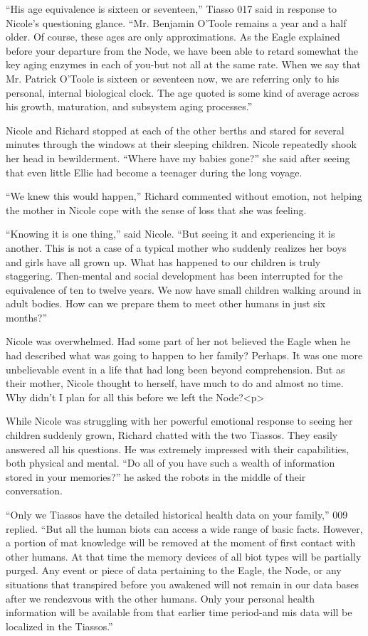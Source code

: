 \documentclass[]{article}
\begin{document}
{“His age equivalence is sixteen or seventeen,” Tiasso 017 said in response to Nicole’s questioning glance. “Mr. Benjamin O’Toole remains a year and a half older. Of course, these ages are only approximations. As the Eagle explained before your departure from the Node, we have been able to retard somewhat the key aging enzymes in each of you-but not all at the same rate. When we say that Mr. Patrick O’Toole is sixteen or seventeen now, we are referring only to his personal, internal biological clock. The age quoted is some kind of average across his growth, maturation, and subsystem aging processes.”

Nicole and Richard stopped at each of the other berths and stared for several minutes through the windows at their sleeping children. Nicole repeatedly shook her head in bewilderment. “Where have my babies gone?” she said after seeing that even little Ellie had become a teenager during the long voyage.

“We knew this would happen,” Richard commented without emotion, not helping the mother in Nicole cope with the sense of loss that she was feeling.

“Knowing it is one thing,” said Nicole. “But seeing it and experiencing it is another. This is not a case of a typical mother who suddenly realizes her boys and girls have all grown up. What has happened to our children is truly staggering. Then-mental and social development has been interrupted for the equivalence of ten to twelve years. We now have small children walking around in adult bodies. How can we prepare them to meet other humans in just six months?”

Nicole was overwhelmed. Had some part of her not believed the Eagle when he had described what was going to happen to her family? Perhaps. It was one more unbelievable event in a life that had long been beyond comprehension. But as their mother, Nicole thought to herself, have much to do and almost no time. Why didn’t I plan for all this before we left the Node?<p>

While Nicole was struggling with her powerful emotional response to seeing her children suddenly grown, Richard chatted with the two Tiassos. They easily answered all his questions. He was extremely impressed with their capabilities, both physical and mental. “Do all of you have such a wealth of information stored in your memories?” he asked the robots in the middle of their conversation.

“Only we Tiassos have the detailed historical health data on your family,” 009 replied. “But all the human biots can access a wide range of basic facts. However, a portion of mat knowledge will be removed at the moment of first contact with other humans. At that time the memory devices of all biot types will be partially purged. Any event or piece of data pertaining to the Eagle, the Node, or any situations that transpired before you awakened will not remain in our data bases after we rendezvous with the other humans. Only your personal health information will be available from that earlier time period-and mis data will be localized in the Tiassos.”

}
\end{document}
